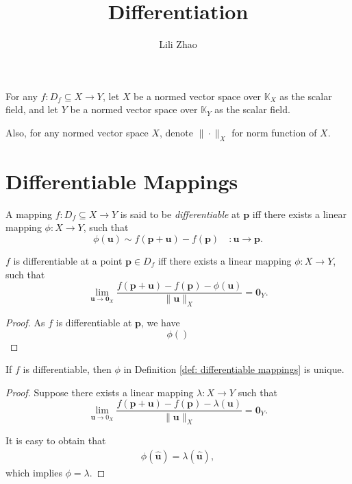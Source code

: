 \documentclass{article}
\title{Differentiation}
\author{Lili Zhao}
\begin{document}
\maketitle


For any $f: D_f \subseteq X \to Y$, let $X$ be a normed vector space over $\mathbb K_X$ as the scalar field, and let $Y$ be a normed vector space over $\mathbb K_Y$ as the scalar field.

Also, for any normed vector space $X$, denote $\| \cdot \|_X$ for norm function of $X$.


\section{Differentiable Mappings}

\begin{definition}
	\label{def: differentiable mappings}
	A mapping $f: D_f \subseteq X \to Y$ is said to be \textit{differentiable}
	 at $\mathbf p$ iff there exists a linear mapping $\phi: X \to Y$, such that
	$$
	\phi(\mathbf u) \sim f(\mathbf p + \mathbf u) - f(\mathbf p) \quad : \mathbf u \to \mathbf p.
	$$
\end{definition}


\begin{proposition}
	$f$ is differentiable at a point $\mathbf p \in D_f$ iff there exists a linear mapping $\phi: X \to Y$, such that
	$$
	\lim_{\mathbf u \to \mathbf 0_X} \frac{f(\mathbf p + \mathbf u) - f(\mathbf p) - \phi(\mathbf u)}{\| \mathbf u \|_X} = \mathbf 0_Y.
	$$
	\begin{proof}
		As $f$ is differentiable at $\mathbf p$, we have
		$$
		\phi()
		$$
	\end{proof}
\end{proposition}


\begin{proposition}
	If $f$ is differentiable, then $\phi$ in Definition \ref{def: differentiable mappings} is unique.
	
	\begin{proof}
		Suppose there exists a linear mapping $\lambda: X\to Y$ such that
		$$
		\lim_{\mathbf u \to 0_X} \frac{f(\mathbf p + \mathbf u) - f(\mathbf p) - \lambda(\mathbf u)}{\| \mathbf u \|_X} = \mathbf 0_Y.
		$$
		
		It is easy to obtain that
		$$
		\begin{aligned}
			\phi(\mathbf{\hat u}) = \lambda(\mathbf{\hat u}),
		\end{aligned}
		$$
		which implies $\phi = \lambda$.
	\end{proof}
\end{proposition}
\end{document}
